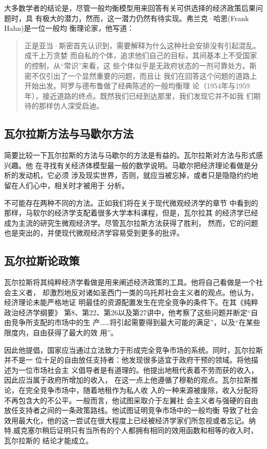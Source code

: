 大多数学者的结论是，尽管一般均衡模型用来回答有关可供选择的经济政策后果问题时，具
有极大的潜力，然而，这一潜力仍然有待实现。弗兰克·哈恩(Frank Hahn)是一位一般均
衡理论家，他写道：

\begin{quotation}
  正是亚当·斯密首先认识到，需要解释为什么这种社会安排没有引起混乱。成千上万贪婪
  而自私的个体，追求他们自己的目标，其间基本上不受国家的控制，从“常识”来看，这
  些个体似乎是无政府状态的一剂可靠处方。斯密不仅引出了一个显然重要的问题，而且让
  我们在回答这个问题的道路上开始出发。阿罗与德布鲁做了经典陈述的一般均衡理
  论（1954年与1959年），接近道路的终点。既然我们已经到达那里，我们发现它并不如我
  们期待的那样仿人深受启迪。
\end{quotation}

\subsection{瓦尔拉斯方法与马歇尔方法}

简要比较一下瓦尔拉斯的方法与马歇尔的方法是有益的。瓦尔拉斯对方法与形式感兴趣。他
在寻找有关经济体模型最一般的数学说明。马歇尔把经济理论看做是分析的发动机，它必须
涉及现实世界，否则，就应当被忘掉，或者只是隐隐约约地留在人们心中，相关时才被用于
分析。

不可能存在两种不同的方法。正如我们将在关于现代微观经济学的章节
中看到的那样，马软尔的经济学支配着很多大学本科课程，但是，瓦尔拉其
的经济学已经成为主流的研究生微观经济学。尽管瓦尔拉斯方法获得了胜利，
然而，它的问题也是突出的，并使现代微观经济学容易受到更多的批评。

\subsection{瓦尔拉斯论政策}

瓦尔拉斯将其纯粹经济学看做是用来阐述经济政策的工具。他将自己看做是一个社会主义者，
却激烈地反对诸如圣西门一类的乌托邦社会主义者的观点。他认为，经济理论未能严格地证
明最佳的资源配置发生在完全竞争的条件下。在其《纯粹政治经济学纲要》
第8、第22、第26以及第27讲中，他考察了这些问题并断定“自由竞争所支配的市场中的生
产……将引起需要得到最大可能的满足”，以及“在某些限度内，自由获得了最大的效
用”。

因此他提倡，国家应当通过立法致力于形成完全竞争市场的系统。同时，瓦尔拉斯并不是一
位十足的自由放任支持者：他发现很多适宜于政府干预的领域。将他描述为一位市场社会主
义倡导者是有道理的。他提出地租代表着不劳而获的收入，因此应当属于政府所增加的收入，
在这一点上他遵循了穆勒的观点。瓦尔拉斯推论，在完全竞争市场中，随着地租作为私人收
入的一种来源被废除，收入分配将不再包含大的不公平。一般而言，他试图采取介于左翼社
会主义者与强硬的自由放任支持者之间的一条政策路线。他试图证明竞争市场中的一般均衡
导致了社会效用最大化，他的这一尝试在很大程度上已经被经济学家们所忽视或者忘记。纳
特.威克塞尔稍后证明只有当所有的个人都拥有相同的效用函数和相等的收入时，瓦尔拉斯的
结论才能成立。

